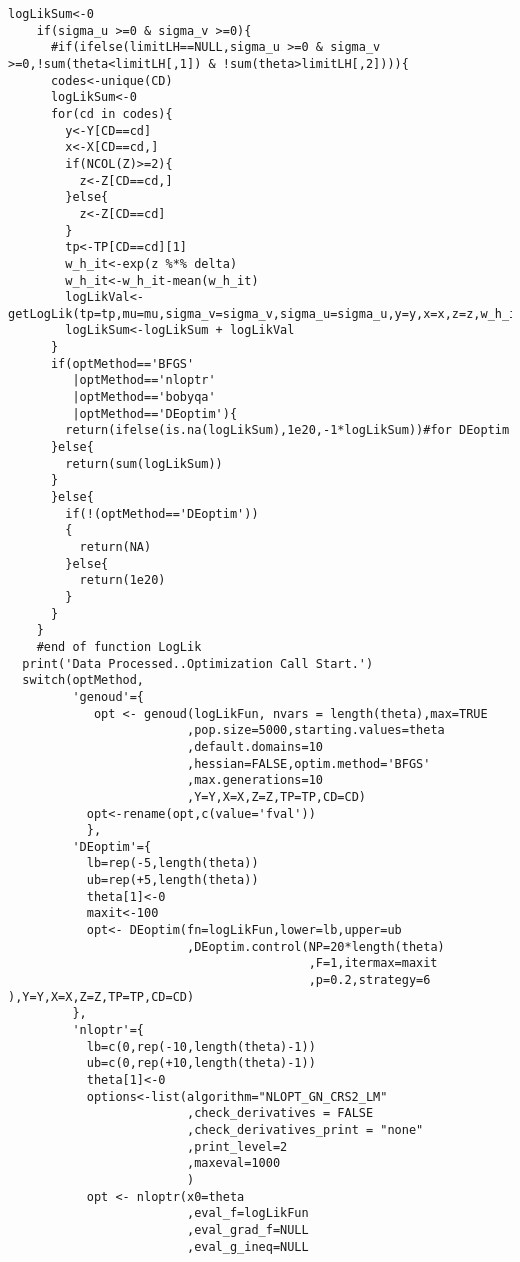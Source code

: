 \begin{lstlisting}[label=Rcode1, caption=R-Code for Maximum Likelihood Function]
    logLikSum<-0
    if(sigma_u >=0 & sigma_v >=0){
      #if(ifelse(limitLH==NULL,sigma_u >=0 & sigma_v >=0,!sum(theta<limitLH[,1]) & !sum(theta>limitLH[,2]))){
      codes<-unique(CD)      
      logLikSum<-0        
      for(cd in codes){
        y<-Y[CD==cd]
        x<-X[CD==cd,]
        if(NCOL(Z)>=2){
          z<-Z[CD==cd,]
        }else{
          z<-Z[CD==cd]
        }
        tp<-TP[CD==cd][1]
        w_h_it<-exp(z %*% delta)
        w_h_it<-w_h_it-mean(w_h_it)
        logLikVal<- getLogLik(tp=tp,mu=mu,sigma_v=sigma_v,sigma_u=sigma_u,y=y,x=x,z=z,w_h_it=w_h_it)         
        logLikSum<-logLikSum + logLikVal      
      }      
      if(optMethod=='BFGS' 
         |optMethod=='nloptr'
         |optMethod=='bobyqa'
         |optMethod=='DEoptim'){
        return(ifelse(is.na(logLikSum),1e20,-1*logLikSum))#for DEoptim        
      }else{        
        return(sum(logLikSum))
      }      
      }else{
        if(!(optMethod=='DEoptim'))
        {
          return(NA)
        }else{
          return(1e20)
        }
      }         
    }
    #end of function LogLik
  print('Data Processed..Optimization Call Start.')
  switch(optMethod,
         'genoud'={
            opt <- genoud(logLikFun, nvars = length(theta),max=TRUE
                         ,pop.size=5000,starting.values=theta
                         ,default.domains=10
                         ,hessian=FALSE,optim.method='BFGS'
                         ,max.generations=10                         
                         ,Y=Y,X=X,Z=Z,TP=TP,CD=CD)         
           opt<-rename(opt,c(value='fval'))                    
           },
         'DEoptim'={
           lb=rep(-5,length(theta)) 
           ub=rep(+5,length(theta))
           theta[1]<-0
           maxit<-100
           opt<- DEoptim(fn=logLikFun,lower=lb,upper=ub
                         ,DEoptim.control(NP=20*length(theta)
                                          ,F=1,itermax=maxit
                                          ,p=0.2,strategy=6 ),Y=Y,X=X,Z=Z,TP=TP,CD=CD)
         },
         'nloptr'={
           lb=c(0,rep(-10,length(theta)-1))
           ub=c(0,rep(+10,length(theta)-1))
           theta[1]<-0
           options<-list(algorithm="NLOPT_GN_CRS2_LM"
                         ,check_derivatives = FALSE
                         ,check_derivatives_print = "none"
                         ,print_level=2
                         ,maxeval=1000                         
                         )
           opt <- nloptr(x0=theta
                         ,eval_f=logLikFun
                         ,eval_grad_f=NULL
                         ,eval_g_ineq=NULL

\end{lstlisting}

